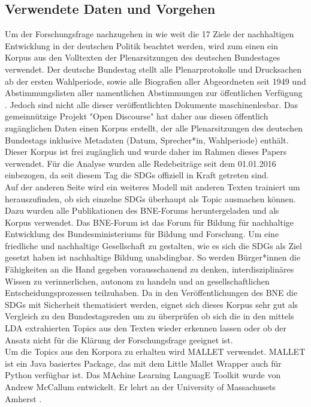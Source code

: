 \documentclass[letterpaper]{article}
\begin{document}
\subsection{Verwendete Daten und Vorgehen}
Um der Forschungsfrage nachzugehen in wie weit die 17 Ziele der nachhaltigen Entwicklung in der deutschen Politik beachtet werden, wird zum einen ein Korpus aus den Volltexten der Plenarsitzungen des deutschen Bundestages verwendet. Der deutsche Bundestag stellt alle Plenarprotokolle und Drucksachen ab der ersten Wahlperiode, sowie alle Biografien aller Abgeordneten seit 1949 und Abstimmungslisten aller namentlichen Abstimmungen zur öffentlichen Verfügung \cite{Bundestag}. Jedoch sind nicht alle dieser veröffentlichten Dokumente maschinenlesbar. Das gemeinnützige Projekt "Open Discourse" hat daher aus diesen öffentlich zugänglichen Daten einen Korpus erstellt, der alle Plenarsitzungen des deutschen Bundestags inklusive Metadaten (Datum, Sprecher*in, Wahlperiode) enthält\cite{OpenDiscourse}. Dieser Korpus ist frei zugänglich und wurde daher im Rahmen dieses Papers verwendet. Für die Analyse wurden alle Redebeiträge seit dem 01.01.2016 einbezogen, da seit diesem Tag die SDGs offiziell in Kraft getreten sind.\\
Auf der anderen Seite wird ein weiteres Modell mit anderen Texten trainiert um herauszufinden, ob sich einzelne SDGs überhaupt als Topic ausmachen können. Dazu wurden alle Publikationen des BNE-Forums heruntergeladen und als Korpus verwendet. Das BNE-Forum ist das Forum für Bildung für nachhaltige Entwicklung des Bundesministeriums für Bildung und Forschung. Um eine friedliche und nachhaltige Gesellschaft zu gestalten, wie es sich die SDGs als Ziel gesetzt haben ist nachhaltige Bildung unabdingbar. So werden Bürger*innen die Fähigkeiten an die Hand gegeben vorausschauend zu denken, interdisziplinäres Wissen zu verinnerlichen, autonom zu handeln und an gesellschaftlichen Entscheidungsprozessen teilzuhaben\cite{BNE}. Da in den Veröffentlichungen des BNE die SDGs mit Sicherheit thematisiert werden, eignet sich dieses Korpus sehr gut als Vergleich zu den Bundestagsreden um zu überprüfen ob sich die in den mittels LDA extrahierten Topics aus den Texten wieder erkennen lassen oder ob der Ansatz nicht für die Klärung der Forschungsfrage geeignet ist.\\
Um die Topics aus den Korpora zu erhalten wird MALLET verwendet. MALLET ist ein Java basiertes Package, das mit dem Little Mallet Wrapper auch für Python verfügbar ist. Das MAchine Learning LanguagE Toolkit wurde von Andrew McCallum entwickelt. Er lehrt an der University of Massachusets Amherst\cite{MALLET} \cite{MALLET_WELSH}.\\
\end{document}
